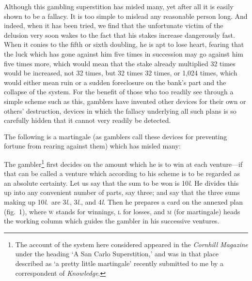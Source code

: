 \documentclass[letterpaper,12pt,oneside,openany]{memoir}
\begin{document}
Although this gambling superstition has misled
many, yet after all it is easily shown to be a fallacy.
It is too simple to mislead any reasonable person long.
And indeed, when it has been tried, we find that the
unfortunate victim of the delusion very soon wakes to
the fact that his stakes increase dangerously fast.
When it conies to the fifth or sixth doubling, he is
apt to lose heart, fearing that the luck which has gone
against him five times in succession may go against him
five times more, which would mean that the stake
already multiplied 32 times would be increased, not 32
times, but 32 times 32 times, or 1,024 times, which
would either mean ruin or a sudden foreclosure on the
bank's part and the collapse of the system.
For the benefit of those who too readily see through
a simple scheme such as this, gamblers have invented
other devices for their own or others' destruction, devices
in which the fallacy underlying all such plans is
so carefully hidden that it cannot very readily be detected.

The following is a martingale (as gamblers call
these devices for preventing fortune from rearing against
them) which has misled many:

The gambler\footnote{The account of the system here considered appeared in the
\textit{Cornhill Magazine} under the heading `A San Carlo Superstition,'
and was in that place described as `a pretty little martingale'
recently submitted to me by a correspondent of \textit{Knowledge}.}
first decides on the amount which he
is to win at each venture---if that can be called a venture
which according to his scheme is to be regarded as
an absolute certainty. Let us say that the sum to be
won is 10\textit{l}. He divides this up into any convenient
number of parts, say three; and say that the three
sums making up 10\textit{l}.\ are 3\textit{l}., 3\textit{l}., and 4\textit{l}. Then he prepares
a card on the annexed plan (fig.~1), where \textsc{w}
stands for winnings, \textsc{l} for losses, and \textsc{m}
(for martingale) heads the working
column which guides the gambler in his
successive ventures.
\end{document}
